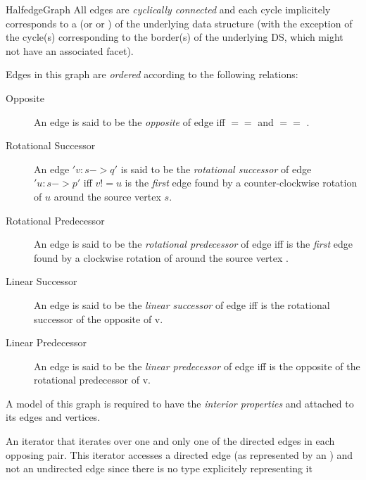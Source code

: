 \begin{ccRefConcept}{HalfedgeGraph}
All edges are {\em cyclically connected} and each cycle implicitely
corresponds to a  (or  or ) of the
underlying data structure (with the exception of the cycle(s)
corresponding to the border(s) of the underlying DS, which might not
have an associated facet).

Edges in this graph are {\em ordered} according to the following relations:

\begin{description}

\item[Opposite] 
An edge  is said to be the {\em opposite} of edge  
iff  $==$  and  $==$ .

\item[Rotational Successor] 
An edge $'v: s->q'$ is said to be the {\em rotational successor} 
of edge $'u: s->p'$ iff $v!=u$ is the {\em first} edge found by 
a counter-clockwise rotation of $u$ around the source vertex $s$.
 
\item[Rotational Predecessor] 
An edge  is said to be the {\em rotational predecessor}
of edge  iff  is the {\em first} edge found by 
a clockwise rotation of  around the source vertex .

\item[Linear Successor] 
An edge  is said to be the {\em linear successor} of edge 
 iff  is the rotational successor of the opposite
of v.
 
\item[Linear Predecessor] 
An edge  is said to be the {\em linear predecessor} of edge 
 iff  is the opposite of the rotational predecessor
of v.

\end{description}

\ccRefines
{}

A model of this graph is required to have the {\em interior properties}  and  attached to its edges and vertices.

\ccTypes
  {An iterator that iterates over one and only one of the directed edges
  in each opposing pair. This iterator accesses a directed edge 
  (as represented by an ) and not an undirected edge 
  since there is no type explicitely representing it}{}


\end{ccRefConcept}
